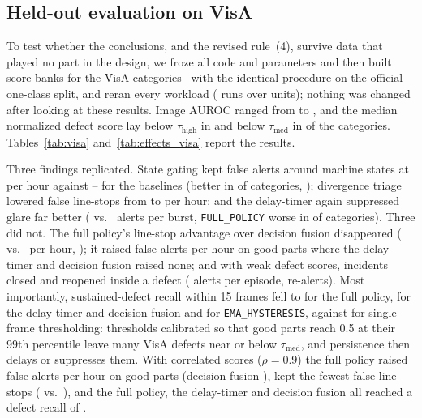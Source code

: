 \documentclass[conference]{IEEEtran}
\begin{document}
\subsection{Held-out evaluation on VisA}
\label{sec:visa}
To test whether the conclusions, and the revised rule~(4), survive data that played no part in the design, we froze all code and parameters and then built score banks for the \VisaNumCategories{} VisA categories~\cite{zou2022visa} with the identical procedure on the official one-class split, and reran every workload (\VisaTotalRuns{} runs over \VisaUnits{} units); nothing was changed after looking at these results. Image AUROC ranged from \VisaAurocMin{} to \VisaAurocMax{}, and the median normalized defect score lay below $\tau_{\text{high}}$ in \VisaDefectMedianBelowHigh{} and below $\tau_{\text{med}}$ in \VisaDefectMedianBelowMed{} of the \VisaNumCategories{} categories. Tables~\ref{tab:visa} and~\ref{tab:effects_visa} report the results.

Three findings replicated. State gating kept false alerts around machine states at \VisaStateFAFull{} per hour against \VisaStateFATimer{}--\VisaStateFAHyst{} for the baselines (better in \VisaEffFAStateFusionWins{} of \VisaNumCategories{} categories, \VisaEffFAStateFusionP{}); divergence triage lowered false line-stops from \VisaCritFANoDiv{} to \VisaCritFAFull{} per hour; and the delay-timer again suppressed glare far better (\VisaGlareTimer{} vs.\ \VisaGlareFull{} alerts per burst, \texttt{FULL\_POLICY} worse in \VisaEffGlareTimerLosses{} of \VisaNumCategories{} categories). Three did not. The full policy's line-stop advantage over decision fusion disappeared (\VisaCritFAFull{} vs.\ \VisaCritFAFusion{} per hour, \VisaEffCritFAMultiFusionP{}); it raised \VisaNominalFAFull{} false alerts per hour on good parts where the delay-timer and decision fusion raised none; and with weak defect scores, incidents closed and reopened inside a defect (\VisaAlertsEpFull{} alerts per episode, \VisaReAlertsFull{} re-alerts). Most importantly, sustained-defect recall within 15 frames fell to \VisaDefectRecallFull{} for the full policy, \VisaDefectRecallFusion{} for the delay-timer and decision fusion and \VisaDefectRecallHyst{} for \texttt{EMA\_HYSTERESIS}, against \VisaDefectRecallBaseline{} for single-frame thresholding: thresholds calibrated so that good parts reach 0.5 at their 99th percentile leave many VisA defects near or below $\tau_{\text{med}}$, and persistence then delays or suppresses them. With correlated scores ($\rho=0.9$) the full policy raised \VisaRhoNominalFAFull{} false alerts per hour on good parts (decision fusion \VisaRhoNominalFAFusion{}), kept the fewest false line-stops (\VisaRhoCritFAFull{} vs.\ \VisaRhoCritFAFusion{}), and the full policy, the delay-timer and decision fusion all reached a defect recall of \VisaRhoDefectRecallFull{}.
\end{document}
